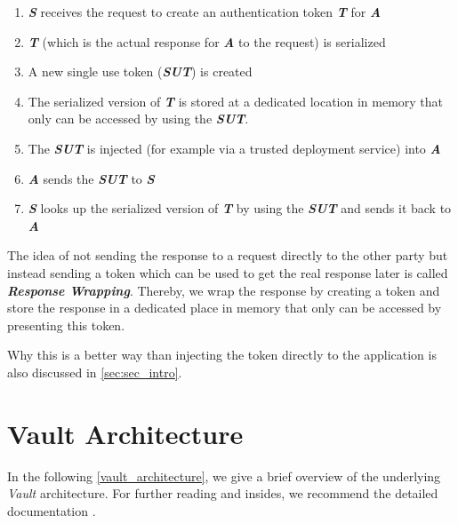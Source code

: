 \documentclass[runningheads]{llncs}
\begin{document}
\begin{enumerate}
    \setlength\itemsep{1mm}
    \item \textbf{\textit{S}} receives the request to create an authentication token \textbf{\textit{T}} for \textbf{\textit{A}}
    \item \textbf{\textit{T}} (which is the actual response for \textbf{\textit{A}} to the request) is serialized
    \item A new single use token (\textbf{\textit{SUT}}) is created
    \item The serialized version of \textbf{\textit{T}} is stored at a dedicated location in memory that only can be accessed by using the \textbf{\textit{SUT}}.
    \item The \textbf{\textit{SUT}} is injected (for example via a trusted deployment service) into \textbf{\textit{A}}
    \item \textbf{\textit{A}} sends the \textbf{\textit{SUT}} to \textbf{\textit{S}}
    \item \textbf{\textit{S}} looks up the serialized version of \textbf{\textit{T}} by using the \textbf{\textit{SUT}} and sends it back to \textbf{\textit{A}}
\end{enumerate}

\noindent
The idea of not sending the response to a request directly to the other party but instead sending a token which can be used to get the real response later is called \textbf{\textit{Response Wrapping}}. Thereby, we wrap the response by creating a token and store the response in a dedicated place in memory that only can be accessed by presenting this token.

Why this is a better way than injecting the token directly to the application is also discussed in \autoref{sec:sec_intro}.

\section{Vault Architecture}

In the following \autoref{vault_architecture}, we give a brief overview of the underlying \textit{Vault} architecture. For further reading and insides, we recommend the detailed documentation \cite{ref_url_vault_architecture}.
\end{document}
